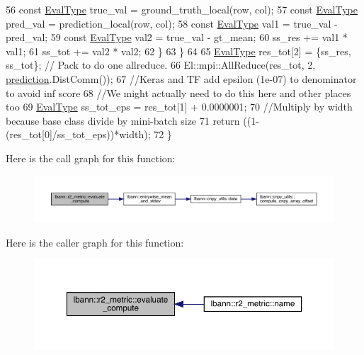 \begin{DoxyCode}
56       \textcolor{keyword}{const} \hyperlink{base_8hpp_a3266f5ac18504bbadea983c109566867}{EvalType} true\_val = ground\_truth\_local(row, col);
57       \textcolor{keyword}{const} \hyperlink{base_8hpp_a3266f5ac18504bbadea983c109566867}{EvalType} pred\_val = prediction\_local(row, col);
58       \textcolor{keyword}{const} \hyperlink{base_8hpp_a3266f5ac18504bbadea983c109566867}{EvalType} val1 = true\_val - pred\_val;
59       \textcolor{keyword}{const} \hyperlink{base_8hpp_a3266f5ac18504bbadea983c109566867}{EvalType} val2 = true\_val - gt\_mean;
60       ss\_res += val1 * val1;
61       ss\_tot += val2 * val2;
62     \}
63   \}
64 
65   \hyperlink{base_8hpp_a3266f5ac18504bbadea983c109566867}{EvalType} res\_tot[2] = \{ss\_res, ss\_tot\};  \textcolor{comment}{// Pack to do one allreduce.}
66   El::mpi::AllReduce(res\_tot, 2, \hyperlink{base_8hpp_a2781a159088df64ed7d47cc91c4dc0a8ac41b9ec75e920b610e8907e066074b30}{prediction}.DistComm());
67   \textcolor{comment}{//Keras and TF add epsilon (1e-07) to denominator to avoid inf score}
68   \textcolor{comment}{//We might actually need to do this here and other places too}
69   \hyperlink{base_8hpp_a3266f5ac18504bbadea983c109566867}{EvalType} ss\_tot\_eps = res\_tot[1] + 0.0000001;
70   \textcolor{comment}{//Multiply by width because base class divide by mini-batch size}
71   \textcolor{keywordflow}{return} ((1-(res\_tot[0]/ss\_tot\_eps))*width); 
72 \}
\end{DoxyCode}
Here is the call graph for this function\+:\nopagebreak
\begin{figure}[H]
\begin{center}
\leavevmode
\includegraphics[width=350pt]{classlbann_1_1r2__metric_a06c84d7944d1d5be896de6b98950e05e_cgraph}
\end{center}
\end{figure}
Here is the caller graph for this function\+:\nopagebreak
\begin{figure}[H]
\begin{center}
\leavevmode
\includegraphics[width=350pt]{classlbann_1_1r2__metric_a06c84d7944d1d5be896de6b98950e05e_icgraph}
\end{center}
\end{figure}
\mbox{\label{classlbann_1_1r2__metric_a66f9280c69b9b079d40b70b9c9c43ad9}} 

